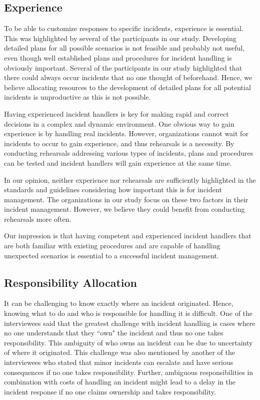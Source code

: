 \subsection{Experience}
\label{sec:experience}
To be able to customize responses to specific incidents, experience is essential. This was highlighted by several of the participants in our study. Developing detailed plans for all possible scenarios is not feasible and probably not useful, even though well established plans and procedures for incident handling is obviously important. Several of the participants in our study highlighted that there could always occur incidents that no one thought of beforehand. Hence, we believe allocating resources to the development of detailed plans for all potential incidents is unproductive as this is not possible.

Having experienced incident handlers is key for making rapid and correct decisions in a complex and dynamic environment. One obvious way to gain experience is by handling real incidents. However, organizations cannot wait for incidents to occur to gain experience, and thus rehearsals is a necessity. By conducting rehearsals addressing various types of incidents, plans and procedures can be tested and incident handlers will gain experience at the same time. 

In our opinion, neither experience nor rehearsals are sufficiently highlighted in the standards and guidelines considering how important this is for incident management. The organizations in our study focus on these two factors in their incident management. However, we believe they could benefit from conducting rehearsals more often.

Our impression is that having competent and experienced incident handlers that are both familiar with existing procedures and are capable of handling unexpected scenarios is essential to a successful incident management.

\subsection{Responsibility Allocation}
It can be challenging to know exactly where an incident originated. Hence, knowing what to do and who is responsible for handling it is difficult. One of the interviewees said that the greatest challenge with incident handling is cases where no one understands that they ``own" the incident and thus no one takes responsibility. This ambiguity of who owns an incident can be due to uncertainty of where it originated. This challenge was also mentioned by another of the interviewees who stated that minor incidents can escalate and have serious consequences if no one takes responsibility. Further, ambiguous responsibilities in combination with costs of handling an incident might lead to a delay in the incident response if no one claims ownership and takes responsibility. 


